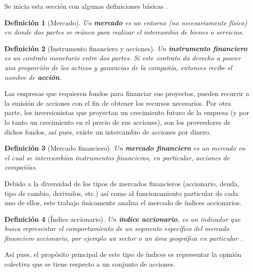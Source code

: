 \documentclass[12pt]{report}
\theoremstyle{break}
\newtheorem{definicion}{Definición}[chapter]
\theoremstyle{break}
\begin{document}
Se inicia esta sección con algunas definiciones básicas \cite{CFA2019-market-org}.

\begin{definicion}[Mercado]
\label{definicion:mercado}
Un \textbf{mercado} es un entorno (no necesariamente físico) en donde dos partes se reúnen para realizar el intercambio de bienes o servicios.
\end{definicion}

\begin{definicion}[Instrumento financiero y acciones]
\label{definicion:instrumento-financiero}
Un \textbf{instrumento financiero} es un contrato monetario entre dos partes. Si este contrato da derecho a poseer una proporción de los activos y ganancias de la compañía, entonces recibe el nombre de \textbf{acción}.
\end{definicion}

Las empresas que requieren fondos para financiar sus proyectos, pueden recurrir a la emisión de acciones con el fin de obtener los recursos necesarios. Por otra parte, los inversionistas que proyectan un crecimiento futuro de la empresa (y por lo tanto un crecimiento en el precio de sus acciones), son los proveedores de dichos fondos, así pues, existe un intercambio de acciones por dinero.

\begin{definicion}[Mercado financiero]
\label{definicion:mercado-financiero}
Un \textbf{mercado financiero} es un mercado en el cual se intercambian instrumentos financieros, en particular, acciones de compañías.
\end{definicion}

Debido a la diversidad de los tipos de mercados financieros (accionario, deuda, tipo de cambio, derivados, etc.) así como al funcionamiento particular de cada uno de ellos, este trabajo  únicamente analiza el mercado de índices accionarios.

\begin{definicion}[Índice accionario]
\label{definicion:indice-accionario}
Un \textbf{índice accionario}, es un indicador que busca representar el comportamiento de un segmento específico del mercado financiero accionario, por ejemplo un sector o un área geográfica en particular \cite{CFA2019-market-index}.
\end{definicion}

Así pues, el propósito principal de este tipo de índices es representar la opinión colectiva que se tiene respecto a un conjunto de acciones.
\end{document}
